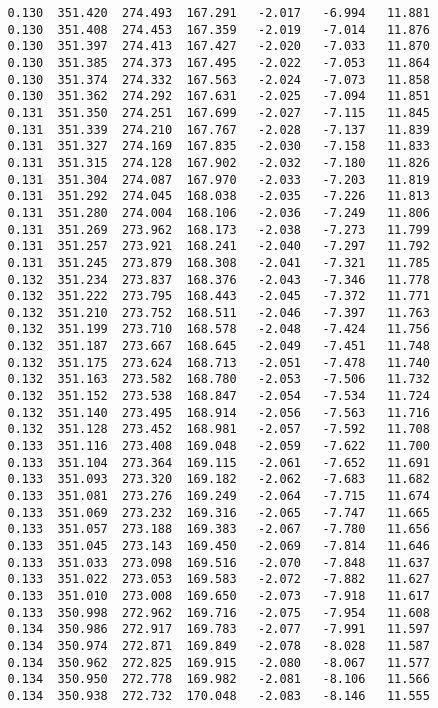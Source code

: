 \begin{verbatim}
   0.130  351.420  274.493  167.291   -2.017   -6.994   11.881
   0.130  351.408  274.453  167.359   -2.019   -7.014   11.876
   0.130  351.397  274.413  167.427   -2.020   -7.033   11.870
   0.130  351.385  274.373  167.495   -2.022   -7.053   11.864
   0.130  351.374  274.332  167.563   -2.024   -7.073   11.858
   0.130  351.362  274.292  167.631   -2.025   -7.094   11.851
   0.131  351.350  274.251  167.699   -2.027   -7.115   11.845
   0.131  351.339  274.210  167.767   -2.028   -7.137   11.839
   0.131  351.327  274.169  167.835   -2.030   -7.158   11.833
   0.131  351.315  274.128  167.902   -2.032   -7.180   11.826
   0.131  351.304  274.087  167.970   -2.033   -7.203   11.819
   0.131  351.292  274.045  168.038   -2.035   -7.226   11.813
   0.131  351.280  274.004  168.106   -2.036   -7.249   11.806
   0.131  351.269  273.962  168.173   -2.038   -7.273   11.799
   0.131  351.257  273.921  168.241   -2.040   -7.297   11.792
   0.131  351.245  273.879  168.308   -2.041   -7.321   11.785
   0.132  351.234  273.837  168.376   -2.043   -7.346   11.778
   0.132  351.222  273.795  168.443   -2.045   -7.372   11.771
   0.132  351.210  273.752  168.511   -2.046   -7.397   11.763
   0.132  351.199  273.710  168.578   -2.048   -7.424   11.756
   0.132  351.187  273.667  168.645   -2.049   -7.451   11.748
   0.132  351.175  273.624  168.713   -2.051   -7.478   11.740
   0.132  351.163  273.582  168.780   -2.053   -7.506   11.732
   0.132  351.152  273.538  168.847   -2.054   -7.534   11.724
   0.132  351.140  273.495  168.914   -2.056   -7.563   11.716
   0.132  351.128  273.452  168.981   -2.057   -7.592   11.708
   0.133  351.116  273.408  169.048   -2.059   -7.622   11.700
   0.133  351.104  273.364  169.115   -2.061   -7.652   11.691
   0.133  351.093  273.320  169.182   -2.062   -7.683   11.682
   0.133  351.081  273.276  169.249   -2.064   -7.715   11.674
   0.133  351.069  273.232  169.316   -2.065   -7.747   11.665
   0.133  351.057  273.188  169.383   -2.067   -7.780   11.656
   0.133  351.045  273.143  169.450   -2.069   -7.814   11.646
   0.133  351.033  273.098  169.516   -2.070   -7.848   11.637
   0.133  351.022  273.053  169.583   -2.072   -7.882   11.627
   0.133  351.010  273.008  169.650   -2.073   -7.918   11.617
   0.133  350.998  272.962  169.716   -2.075   -7.954   11.608
   0.134  350.986  272.917  169.783   -2.077   -7.991   11.597
   0.134  350.974  272.871  169.849   -2.078   -8.028   11.587
   0.134  350.962  272.825  169.915   -2.080   -8.067   11.577
   0.134  350.950  272.778  169.982   -2.081   -8.106   11.566
   0.134  350.938  272.732  170.048   -2.083   -8.146   11.555

\end{verbatim}
